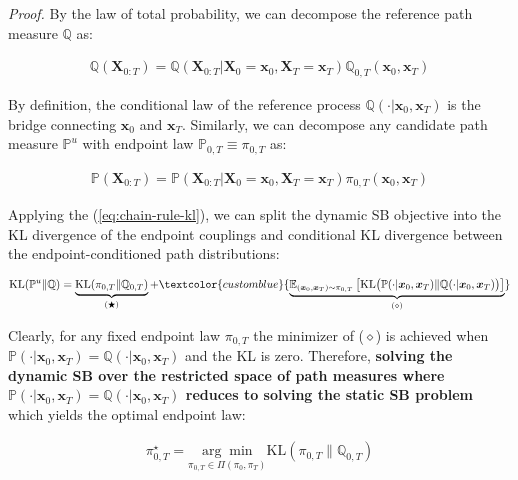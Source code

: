 \documentclass{article}
\newcommand{\bluetext}[1]{\textcolor{customblue}{#1}}
\begin{document}
\textit{Proof.} By the law of total probability, we can decompose the reference path measure $\mathbb{Q}$ as:
\begin{small}
\begin{align}
    \mathbb{Q}(\boldsymbol{X}_{0:T})=\mathbb{Q}(\boldsymbol{X}_{0:T}|\boldsymbol{X}_0=\boldsymbol{x}_0, \boldsymbol{X}_T=\boldsymbol{x}_T)\mathbb{Q}_{0,T}(\boldsymbol{x}_0, \boldsymbol{x}_T)
\end{align}
\end{small}
By definition, the conditional law of the reference process $\mathbb{Q}(\cdot|\boldsymbol{x}_0, \boldsymbol{x}_T)$ is the bridge connecting $\boldsymbol{x}_0$ and $\boldsymbol{x}_T$. Similarly, we can decompose any candidate path measure $\mathbb{P}^u$ with endpoint law $\mathbb{P}_{0,T}\equiv\pi_{0,T}$ as:
\begin{small}
\begin{align}
    \mathbb{P}(\boldsymbol{X}_{0:T})=\mathbb{P}(\boldsymbol{X}_{0:T}|\boldsymbol{X}_0=\boldsymbol{x}_0, \boldsymbol{X}_T=\boldsymbol{x}_T)\pi_{0,T}(\boldsymbol{x}_0, \boldsymbol{x}_T)
\end{align}
\end{small}
Applying the (\ref{eq:chain-rule-kl}), we can split the dynamic SB objective into the KL divergence of the endpoint couplings and conditional KL divergence between the endpoint-conditioned path distributions:
\begin{small}
\begin{align}
    \text{KL}(\mathbb{P}^u\|\mathbb{Q})=\underbrace{\text{KL}(\pi_{0,T}\|\mathbb{Q}_{0,T})}_{(\bigstar)}+\bluetext{\underbrace{\mathbb{E}_{(\boldsymbol{x}_0, \boldsymbol{x}_T)\sim \pi_{0,T}}\left[\text{KL}\big(\mathbb{P}(\cdot|\boldsymbol{x}_0, \boldsymbol{x}_T)\|\mathbb{Q}(\cdot|\boldsymbol{x}_0, \boldsymbol{x}_T)\big)\right]}_{(\diamond)}}
\end{align}
\end{small}
Clearly, for any fixed endpoint law $\pi_{0,T}$ the minimizer of ($\diamond$) is achieved when $\mathbb{P}(\cdot|\boldsymbol{x}_0, \boldsymbol{x}_T)=\mathbb{Q}(\cdot|\boldsymbol{x}_0, \boldsymbol{x}_T)$ and the KL is zero. Therefore, \textbf{solving the dynamic SB over the restricted space of path measures where $\mathbb{P}(\cdot|\boldsymbol{x}_0, \boldsymbol{x}_T)=\mathbb{Q}(\cdot|\boldsymbol{x}_0, \boldsymbol{x}_T)$ reduces to solving the static SB problem} which yields the optimal endpoint law:
\begin{small}
\begin{align}
    \pi^\star_{0,T}=\underset{\pi_{0,T}\in \Pi(\pi_0, \pi_T)}{\arg\min}\text{KL}(\pi_{0,T}\|\mathbb{Q}_{0,T})
\end{align}
\end{small}
\end{document}
